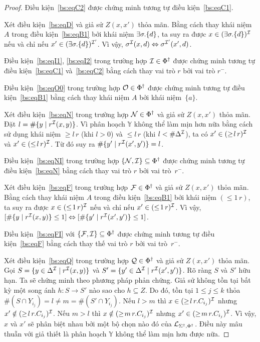 \begin{proof}
	\semiItem{}Điều kiện~\eqref{bs:eqC2} được chứng minh tương tự điều kiện~\eqref{bs:eqC1}.
	
	\semiItem{}Xét điều kiện~\eqref{bs:eqD} và giả sử $Z(x,x')$ thỏa mãn. Bằng cách thay khái niệm $A$ trong điều kiện~\eqref{bs:eqB1} bởi khái niệm $\exists \sigma.\{d\}$, ta suy ra được $x \in (\exists \sigma.\{d\})^{\mathcal{I}}$ nếu và chỉ nếu $x' \in (\exists \sigma.\{d\})^{\mathcal{I}'}$. Vì vậy, $\sigma^{\mathcal{I}}(x,d) \Leftrightarrow \sigma^{\mathcal{I}'}(x',d)$.
	
	\semiItem{}Điều kiện~\eqref{bs:eqI1}, \eqref{bs:eqI2} trong trường hợp $\mathcal{I} \in \Phi^\dag$ được chứng minh tương tự điều kiện~\eqref{bs:eqC1} và~\eqref{bs:eqC2} bằng cách thay vai trò $r$ bởi vai trò $r^-$.
	
	\semiItem{}Điều kiện~\eqref{bs:eqO0} trong trường hợp $\mathcal{O} \in \Phi^\dag$ được chứng minh tương tự điều kiện~\eqref{bs:eqB1} bằng cách thay khái niệm $A$ bởi khái niệm~$\{a\}$.
	
	\semiItem{}Xét điều kiện~\eqref{bs:eqN} trong trường hợp $\mathcal{N} \in \Phi^\dag$ và giả sử $Z(x,x')$ thỏa mãn. Đặt $l = \# \{y \mid r^{\mathcal{I}}(x,y)\}$. Vì phân hoạch $\mathbb{Y}$ không thể làm mịn hơn nữa bằng cách sử dụng khái niệm $\geq\!l\,r$ (khi $l > 0$) và $\leq\!l\,r$ (khi $l < \# \Delta^{\mathcal{I}}$), ta có $x' \in (\geq\!l\,r)^{\mathcal{I}}$ và $x' \in (\leq\!l\,r)^{\mathcal{I}}$. Từ đó suy ra $\# \{y' \mid r^{\mathcal{I}}(x',y')\} = l$.
	
	\semiItem{}Điều kiện~\eqref{bs:eqNI} trong trường hợp $\{\mathcal{N}, \mathcal{I}\} \subseteq \Phi^\dag$ được chứng minh tương tự điều kiện~\eqref{bs:eqN} bằng cách thay vai trò $r$ bởi vai trò~$r^-$.
	
	\semiItem{}Xét điều kiện~\eqref{bs:eqF} trong trường hợp $\mathcal{F} \in \Phi^\dag$ và giả sử $Z(x,x')$ thỏa mãn. Bằng cách thay khái niệm $A$ trong điều kiện~\eqref{bs:eqB1} bởi khái niệm $(\leq\!1\,r)$, ta suy ra được $x \in (\leq\!1\,r)^{\mathcal{I}}$ nếu và chỉ nếu $x' \in (\leq\!1\,r)^{\mathcal{I}}$. Vì vậy, $[\#\{y \mid r^{\mathcal{I}}(x,y)\} \leq 1] \Leftrightarrow [\#\{y' \mid r^{\mathcal{I}}(x',y')\} \leq 1]$.
	
	\semiItem{}Điều kiện~\eqref{bs:eqFI} với $\{\mathcal{F}, \mathcal{I}\} \subseteq \Phi^\dag$ được chứng minh tương tự điều kiện~\eqref{bs:eqF} bằng cách thay thế vai trò $r$ bởi vai trò~$r^-$.
	
	\semiItem{}Xét điều kiện~\eqref{bs:eqQ} trong trường hợp $\mathcal{Q} \in \Phi^\dag$ và giả sử $Z(x,x')$ thỏa mãn. Gọi $S = \{y \in \Delta^{\mathcal{I}} \mid r^{\mathcal{I}}(x,y)\}$ và $S' = \{y' \in \Delta^{\mathcal{I}} \mid r^{\mathcal{I}}(x',y')\}$. Rõ ràng $S$ và $S'$ hữu hạn. Ta sẽ chứng minh theo phương pháp phản chứng. Giả sử không tồn tại bất kỳ một song ánh $h:S \to S'$ nào sao cho $h \subseteq Z$. Do đó, tồn tại $1 \leq j \leq k$ thỏa $\#(S\cap Y_{i_j}) = l \neq m = \# (S' \cap Y_{i_j})$. Nếu $l > m$ thì $x \in (\geq\!l\,r.C_{i_j})^{\mathcal{I}}$ nhưng $x' \notin (\geq\!l\,r.C_{i_j})^{\mathcal{I}}$. Nếu $m > l$ thì $x \notin (\geq\!m\,r.C_{i_j})^{\mathcal{I}}$ nhưng $x' \in (\geq\!m\,r.C_{i_j})^{\mathcal{I}}$. Vì vậy, $x$ và $x'$ sẽ phân biệt nhau bởi một bộ chọn nào đó của $\mathcal{L}_{\Sigma^\dag,\Phi^\dag}$. Điều này mâu thuẫn với giả thiết là phân hoạch $\mathbb{Y}$ không thể làm mịn hơn được nữa.
	

\end{proof}
